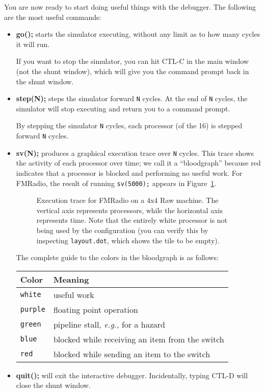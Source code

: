 You are now ready to start doing useful things with the debugger.  The
following are the most useful commands:

\begin{itemize}

\item {\bf go();} starts the simulator executing, without any limit as
to how many cycles it will run.

If you want to stop the simulator, you can hit CTL-C in the main
window (not the shunt window), which will give you the command prompt
back in the shunt window.

\item {\bf step(N);} steps the simulator forward \texttt{N} cycles. At
the end of {\tt N} cycles, the simulator will stop executing and
return you to a command prompt.

By stepping the simulator \texttt{N} cycles, each processor (of the
16) is stepped forward \texttt{N} cycles.

\item {\bf sv(N);} produces a graphical execution trace over {\tt N}
cycles.  This trace shows the activity of each processor over time; we
call it a ``bloodgraph'' because red indicates that a processor is
blocked and performing no useful work.  For FMRadio, the result of
running {\tt sv(5000);} appears in Figure~\ref{fig:fm-bloodgraph}.

\clearpage

\begin{figure}[t]
\begin{center}
\hspace{0pt}
\caption{\protect\small Execution trace for FMRadio on a 4x4 Raw
machine.  The vertical axis represents processors, while the
horizontal axis represents time.  Note that the entirely white
processor is not being used by the configuration (you can verify this
by inspecting {\tt layout.dot}, which shows the tile to be
empty).\protect\label{fig:fm-bloodgraph}}
\end{center}
\end{figure}

The complete guide to the colors in the bloodgraph is as follows: \vspace{6pt}

\begin{tabular}{|l|l|}
\hline
{\bf Color} & {\bf Meaning} \\
\hline
{\tt white} & useful work\\ \hline
{\tt purple} & floating point operation\\ \hline
{\tt green} & pipeline stall, {\it e.g.,} for a hazard\\ \hline
{\tt blue} & blocked while receiving an item from the switch\\ \hline
{\tt red} & blocked while sending an item to the switch\\ \hline
\end{tabular}

\item {\bf quit();} will exit the interactive debugger.  Incidentally,
typing CTL-D will close the shunt window.

\end{itemize}

